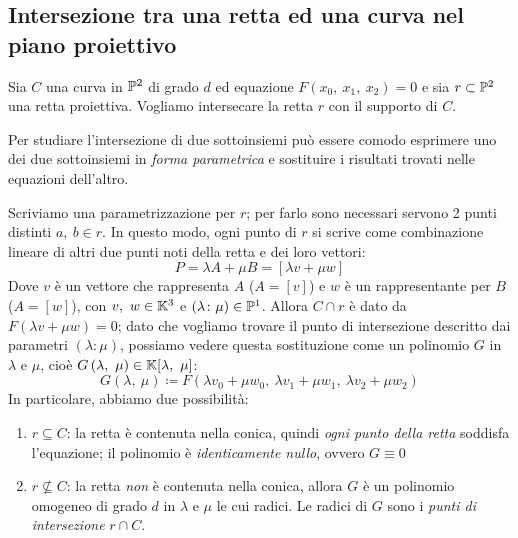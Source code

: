 \subsection{Intersezione tra una retta ed una curva nel piano proiettivo}
Sia $C$ una curva in $\proj[2]{\ }$ di grado $d$ ed equazione $F(x_0,\ x_1,\ x_2)=0$ e sia $r\subset\proj[2]{\ }$ una retta proiettiva. Vogliamo intersecare la retta $r$ con il supporto di $C$.
\begin{tips}
	Per studiare l'intersezione di due sottoinsiemi può essere comodo esprimere uno dei due sottoinsiemi in \textit{forma parametrica} e sostituire i risultati trovati nelle equazioni dell'altro.
\end{tips}
Scriviamo una parametrizzazione per $r$; per farlo sono necessari servono 2 punti distinti $a,\ b\in r$. In questo modo, ogni punto di $r$ si scrive come combinazione lineare di altri due punti noti della retta e dei loro vettori:
\begin{equation}
	P=\lambda A+\mu B=\left[\lambda v+\mu w\right]
\end{equation}
Dove $v$ è un vettore che rappresenta $A$ ($A=[v]$) e $w$ è un rappresentante per $B$ ($A=[w]$), con $v,\ w\in\mathbb{K}^3$ e $(\lambda\colon\mu)\in\proj[1]{\ }$. Allora $C\cap r$ è dato da $F(\lambda v+\mu w)=0$; dato che vogliamo trovare il punto di intersezione descritto dai parametri $(\lambda\colon\mu)$, possiamo vedere questa sostituzione come un polinomio $G$ in $\lambda$ e $\mu$, cioè $G\left(\lambda,\ \mu\right)\in\kamp[\lambda,\ \mu]$:
\begin{equation}
	G\left(\lambda,\ \mu\right)\coloneqq F(\lambda v_0+\mu w_0,\ \lambda v_1+\mu w_1,\ \lambda v_2+\mu w_2)
\end{equation}
In particolare, abbiamo due possibilità:
	\begin{enumerate}
	\item	$r\subseteq C$: la retta è contenuta nella conica, quindi \textit{ogni punto della retta} soddisfa l'equazione; il polinomio è \textit{identicamente nullo}, ovvero $G\equiv 0$
	\item	$r\nsubseteq C$: la retta \textit{non} è contenuta nella conica, allora $G$ è un polinomio omogeneo di grado $d$ in $\lambda$ e $\mu$ le cui radici. Le radici di $G$ sono i \textit{punti di intersezione} $r\cap C$. 
\end{enumerate}
